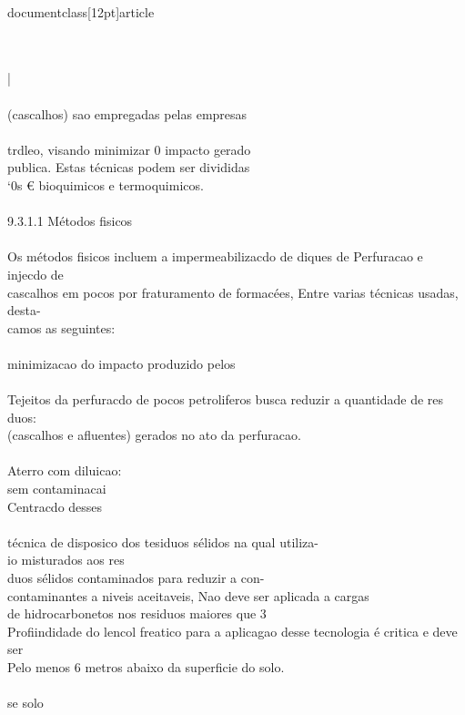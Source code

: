 \\documentclass[12pt]{article}
\begin{document}
\\{\\
|\\
\\
(cascalhos) sao empregadas pelas empresas\\
\\
trdleo, visando minimizar 0 impacto gerado\\
publica. Estas técnicas podem ser divididas\\
‘0s € bioquimicos e termoquimicos.\\
\\
9.3.1.1 Métodos fisicos\\
\\
Os métodos fisicos incluem a impermeabilizacdo de diques de Perfuracao e injecdo de\\
cascalhos em pocos por fraturamento de formacées, Entre varias técnicas usadas, desta-\\
camos as seguintes:\\
\\
 minimizacao do impacto produzido pelos\\
\\
Tejeitos da perfuracdo de pocos petroliferos busca reduzir a quantidade de res\\{duos:\\
(cascalhos e afluentes) gerados no ato da perfuracao.\\
\\
Aterro com diluicao:\\
sem contaminacai\\
Centracdo desses\\
\\
técnica de disposico dos tesiduos sélidos na qual utiliza-\\
io misturados aos res\\{duos sélidos contaminados para reduzir a con-\\
contaminantes a niveis aceitaveis, Nao deve ser aplicada a cargas\\
de hidrocarbonetos nos residuos maiores que 3\\%
Profiindidade do lencol freatico para a aplicagao desse tecnologia é critica e deve ser\\
Pelo menos 6 metros abaixo da superficie do solo.\\
\\
se solo\\
\\
}}}
\end{document}
